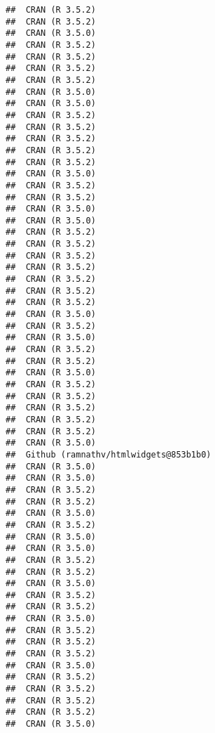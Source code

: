 \documentclass[]{article}
\begin{document}
\begin{verbatim}
##  CRAN (R 3.5.2)                       
##  CRAN (R 3.5.2)                       
##  CRAN (R 3.5.0)                       
##  CRAN (R 3.5.2)                       
##  CRAN (R 3.5.2)                       
##  CRAN (R 3.5.2)                       
##  CRAN (R 3.5.2)                       
##  CRAN (R 3.5.0)                       
##  CRAN (R 3.5.0)                       
##  CRAN (R 3.5.2)                       
##  CRAN (R 3.5.2)                       
##  CRAN (R 3.5.2)                       
##  CRAN (R 3.5.2)                       
##  CRAN (R 3.5.2)                       
##  CRAN (R 3.5.0)                       
##  CRAN (R 3.5.2)                       
##  CRAN (R 3.5.2)                       
##  CRAN (R 3.5.0)                       
##  CRAN (R 3.5.0)                       
##  CRAN (R 3.5.2)                       
##  CRAN (R 3.5.2)                       
##  CRAN (R 3.5.2)                       
##  CRAN (R 3.5.2)                       
##  CRAN (R 3.5.2)                       
##  CRAN (R 3.5.2)                       
##  CRAN (R 3.5.2)                       
##  CRAN (R 3.5.0)                       
##  CRAN (R 3.5.2)                       
##  CRAN (R 3.5.0)                       
##  CRAN (R 3.5.2)                       
##  CRAN (R 3.5.2)                       
##  CRAN (R 3.5.0)                       
##  CRAN (R 3.5.2)                       
##  CRAN (R 3.5.2)                       
##  CRAN (R 3.5.2)                       
##  CRAN (R 3.5.2)                       
##  CRAN (R 3.5.2)                       
##  CRAN (R 3.5.0)                       
##  Github (ramnathv/htmlwidgets@853b1b0)
##  CRAN (R 3.5.0)                       
##  CRAN (R 3.5.0)                       
##  CRAN (R 3.5.2)                       
##  CRAN (R 3.5.2)                       
##  CRAN (R 3.5.0)                       
##  CRAN (R 3.5.2)                       
##  CRAN (R 3.5.0)                       
##  CRAN (R 3.5.0)                       
##  CRAN (R 3.5.2)                       
##  CRAN (R 3.5.2)                       
##  CRAN (R 3.5.0)                       
##  CRAN (R 3.5.2)                       
##  CRAN (R 3.5.2)                       
##  CRAN (R 3.5.0)                       
##  CRAN (R 3.5.2)                       
##  CRAN (R 3.5.2)                       
##  CRAN (R 3.5.2)                       
##  CRAN (R 3.5.0)                       
##  CRAN (R 3.5.2)                       
##  CRAN (R 3.5.2)                       
##  CRAN (R 3.5.2)                       
##  CRAN (R 3.5.2)                       
##  CRAN (R 3.5.0)                       

\end{verbatim}
\end{document}
